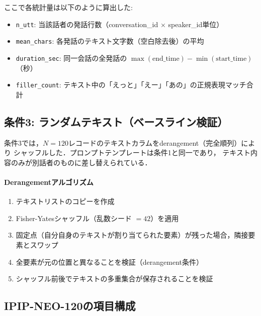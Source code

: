 \documentclass[dvipdfmx,11pt,a4paper]{bxjsarticle}
\begin{document}
ここで各統計量は以下のように算出した:
\begin{itemize}
  \item \texttt{n\_utt}: 当該話者の発話行数（conversation\_id $\times$ speaker\_id単位）
  \item \texttt{mean\_chars}: 各発話のテキスト文字数（空白除去後）の平均
  \item \texttt{duration\_sec}: 同一会話の全発話の $\max(\text{end\_time}) - \min(\text{start\_time})$（秒）
  \item \texttt{filler\_count}: テキスト中の「えっと」「えー」「あの」の正規表現マッチ合計
\end{itemize}

\subsection{条件3: ランダムテキスト（ベースライン検証）}
\label{sec:appendix_prompt_cond3}

条件3では，$N = 120$レコードのテキストカラムをderangement（完全順列）により
シャッフルした．プロンプトテンプレートは条件1と同一であり，
テキスト内容のみが別話者のものに差し替えられている．

\paragraph{Derangementアルゴリズム}
\begin{enumerate}
  \item テキストリストのコピーを作成
  \item Fisher-Yatesシャッフル（乱数シード $= 42$）を適用
  \item 固定点（自分自身のテキストが割り当てられた要素）が残った場合，隣接要素とスワップ
  \item 全要素が元の位置と異なることを検証（derangement条件）
  \item シャッフル前後でテキストの多重集合が保存されることを検証
\end{enumerate}

\subsection{IPIP-NEO-120の項目構成}
\label{sec:appendix_ipip}
\end{document}
